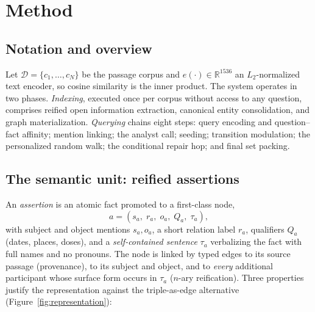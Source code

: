 \documentclass[11pt,a4paper]{article}
\newcommand{\R}{\mathbb{R}}
\begin{document}
\section{Method}
\label{sec:method}

\subsection{Notation and overview}
Let $\mathcal D=\{c_1,\dots,c_N\}$ be the passage corpus and
$e(\cdot)\in\R^{1536}$ an $L_2$-normalized text encoder, so cosine similarity
is the inner product. The system operates in two phases. \emph{Indexing},
executed once per corpus without access to any question, comprises reified
open information extraction, canonical entity consolidation, and graph
materialization. \emph{Querying} chains eight steps: query encoding and
question--fact affinity; mention linking; the analyst call; seeding;
transition modulation; the personalized random walk; the conditional repair
hop; and final set packing.

\subsection{The semantic unit: reified assertions}
\label{sec:assertion}

An \emph{assertion} is an atomic fact promoted to a first-class node,
\begin{equation}
a=(s_a,\;r_a,\;o_a,\;Q_a,\;\tau_a),
\label{eq:assertion}
\end{equation}
with subject and object mentions $s_a,o_a$, a short relation label $r_a$,
qualifiers $Q_a$ (dates, places, doses), and a \emph{self-contained sentence}
$\tau_a$ verbalizing the fact with full names and no pronouns. The node is
linked by typed edges to its source passage (provenance), to its subject and
object, and to \emph{every} additional participant whose surface form occurs
in $\tau_a$ ($n$-ary reification). Three properties justify the
representation against the triple-as-edge alternative
(Figure~\ref{fig:representation}):
\end{document}
